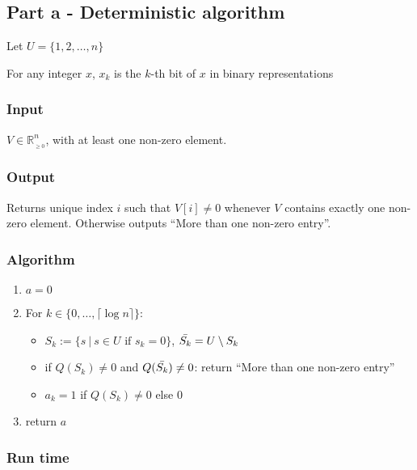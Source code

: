 \subsection*{Part a - Deterministic algorithm}

Let $U = \{1,2,\dots,n\}$

For any integer $x$, $x_k$ is the $k$-th bit of $x$ in binary representations

\subsubsection*{Input}

$V \in \mathbb{R}_{_{\geq 0}}^n$, with at least one non-zero element.

\subsubsection*{Output}

Returns unique index $i$ such that $V[i] \neq 0$ whenever $V$ contains exactly one non-zero element. Otherwise outputs ``More than one non-zero entry''.

\subsubsection*{Algorithm}


\begin{enumerate}
    \item $a = 0$

    \item For $k \in \{0,\dots, \lceil \log n \rceil\}$:

    \begin{itemize}
        \item $S_k := \{s ~ | ~ s \in U \text{ if } s_k = 0 \}$, $\Bar{S_k} = U \setminus S_k$
                
        \item if $Q(S_k) \neq 0$ and $Q(\Bar{S_k}) \neq 0$: return ``More than one non-zero entry''
        
        \item $a_k = 1$ if $Q(S_k) \neq 0$ else $0$
        
    \end{itemize}
    
    \item return $a$
\end{enumerate}


\subsubsection*{Run time}

